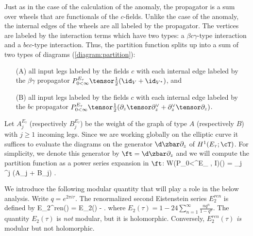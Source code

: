 Just as in the case of the calculation of the anomaly, the propagator is a sum over wheels that are functionals of the $c$-fields. 
Unlike the case of the anomaly, the internal edges of the wheels are all labeled by the propagator. 
The vertices are labeled by the interaction terms which have two types: a $\beta c \gamma$-type interaction and a $bcc$-type interaction. 
Thus, the partition function splits up into a sum of two types of diagrams (\ref{diagram:partition}): 
\begin{enumerate}
\item[(A)] all input legs labeled by the fields $c$ with each internal edge labeled by the $\beta\gamma$ propagator $P_{0<\infty}^{E_\tau} \tensor \frac{1}{2} (\id_V + \id_{V^*})$, and 
\item[(B)] all input legs labeled by the fields $c$ with each internal edge labeled by the $bc$ propagator $P_{0<\infty}^{E_\tau} \tensor \frac{1}{2}(\partial_z \tensor \partial_z^\vee + \partial_z^\vee \tensor \partial_z)$. 
\end{enumerate}
Let $A^{E_\tau}_j$ (respectively $B^{E_\tau}_j$) be the weight of the graph of type $A$ (respectively $B$) with $j \geq 1$ incoming legs.
Since we are working globally on the elliptic curve it suffices to evaluate the diagrams on the generator $\d \zbar \partial_z$ of $H^1(E_\tau ; \cT)$. 
For simplicity, we denote this generator by $\ft = \d \zbar \partial_z$ and we will compute the partition function as a power series expansion in $\ft$:
\ben
W(P_{0<\infty}^{E_\tau} , I)(\ft) = \sum_{j } \ft^j (A_j + B_j) .
\een 

We introduce the following modular quantity that will play a role in the below analysis. 
Write $q = e^{2 \pi i \tau}$.
The renormalized second Eistenstein series $E_2^{ren}$ is defined by
\ben
E_2^{ren}(\tau) = E_2(\tau) -   .
\een
where $E_2(\tau) = 1 - 24 \sum_{n=1}^\infty \frac{n q^n}{1-q^n}$. 
The quantity $E_2(\tau)$ is {\em not} modular, but it is holomorphic. 
Conversely, $E_2^{ren}(\tau)$ {\em is} modular but not holomorphic.  

